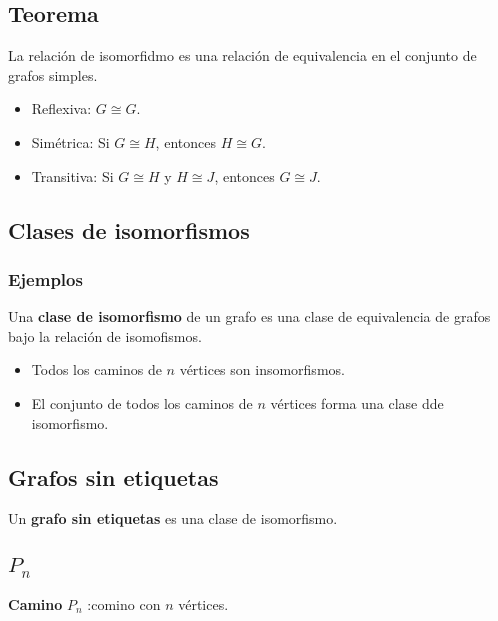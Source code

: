 \documentclass[a4paper]{book}
\begin{document}
\subsection{Teorema}
\label{ssec:teorema}

La relación de isomorfidmo es una relación de equivalencia en el conjunto de
grafos simples.

\begin{itemize}
    \item Reflexiva: \(G\cong G\).
    \item Simétrica: Si \(G\cong H\), entonces \(H\cong G\).
    \item Transitiva: Si \(G\cong H\) y \(H\cong J\), entonces \(G\cong J\).
\end{itemize}

\subsection{Clases de isomorfismos}
\label{ssec:clases_de_isomorfismos}

\subsubsection{Ejemplos}
\label{ssec:ejemplos}

Una \textbf{clase de isomorfismo} de un grafo es una clase de equivalencia de
grafos bajo la relación de isomofismos.

\begin{itemize}
    \item Todos los caminos de \(n\) vértices son insomorfismos.
    \item El conjunto de todos los caminos de \(n\) vértices forma una clase
        dde isomorfismo.
\end{itemize}

\subsection{Grafos sin etiquetas}
\label{ssec:grafos_sin_etiquetas}

Un \textbf{grafo sin etiquetas} es una  clase de isomorfismo.

\subsection{\(P_{n}\)}
\label{ssec:pn}

\textbf{Camino} \(P_{n}\) :comino con \(n\) vértices.
\end{document}
